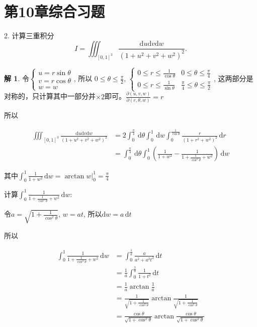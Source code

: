 \documentclass[a4paper,12pt]{article}
\theoremstyle{definition}
\newtheorem*{sol}{解}
\begin{document}
\section*{第10章综合习题}

2. 计算三重积分
$$
    I = \iiint_{[0,1]^3} \frac{\mathrm{d}u\mathrm{d}v\mathrm{d}w}{(1 + u^2 + v^2 + w^2)^2}.
$$
\begin{sol}
    令$\begin{cases}
            u=r\sin\theta \\
            v=r\cos\theta \\
            w=w
        \end{cases}$, 所以 $0\leq\theta\leq\frac{\pi}{2}$, $\begin{cases}
            0\leq r\leq\frac{1}{\cos\theta} & 0\leq\theta\leq\frac{\pi}{4}             \\
            0\leq r\leq\frac{1}{\sin\theta} & \frac{\pi}{4}\leq\theta\leq\frac{\pi}{2}
        \end{cases}$, 这两部分是对称的，只计算其中一部分并$\times 2$即可。$\frac{\partial(u,v,w)}{\partial(r,\theta,w)}=r$

    所以

    \begin{align*}
        \iiint_{[0,1]^3} \frac{\mathrm{d}u\mathrm{d}v\mathrm{d}w}{(1 + u^2 + v^2 + w^2)^2}
         & =2\int_0^{\frac{\pi}{4}}\,\mathrm{d}\theta\int_0^1\,\mathrm{d}w\int_0^{\frac{1}{\cos\theta}}\frac{r}{(1+r^2+w^2)^2}\,\mathrm{d}r  \\
         & =\int_0^{\frac{\pi}{4}}\,\mathrm{d}\theta\int_0^1\left(\frac{1}{1+w^2}-\frac{1}{1+\frac{1}{\cos^2\theta}+w^2}\right)\,\mathrm{d}w
    \end{align*}

    其中$\int_0^1\frac{1}{1+w^2}\,\mathrm{d}w=\arctan w|_0^1=\frac{\pi}{4}$

    计算$\int_0^1\frac{1}{1+\frac{1}{\cos^2\theta}+w^2}\,\mathrm{d}w$:

    令$a=\sqrt{1+\frac{1}{\cos^2\theta}}$, $w=at$, 所以$\mathrm{d}w=a\,\mathrm{d}t$

    所以

    \begin{align*}
        \int_0^1\frac{1}{1+\frac{1}{\cos^2\theta}+w^2}\,\mathrm{d}w
         & =\int_0^{\frac{1}{a}}\frac{a}{a^2+a^2t^2}\,\mathrm{d}t                                     \\
         & =\frac{1}{a}\int_0^{\frac{1}{a}}\frac{1}{1+t^2}\,\mathrm{d}t                               \\
         & =\frac{1}{a}\arctan\frac{1}{a}                                                             \\
         & =\frac{1}{\sqrt{1+\frac{1}{\cos^2\theta}}}\arctan\frac{1}{\sqrt{1+\frac{1}{\cos^2\theta}}} \\
         & =\frac{\cos\theta}{\sqrt{1+\cos^2\theta}}\arctan\frac{\cos\theta}{\sqrt{1+\cos^2\theta}}   \\
    \end{align*}


\end{sol}
\end{document}
